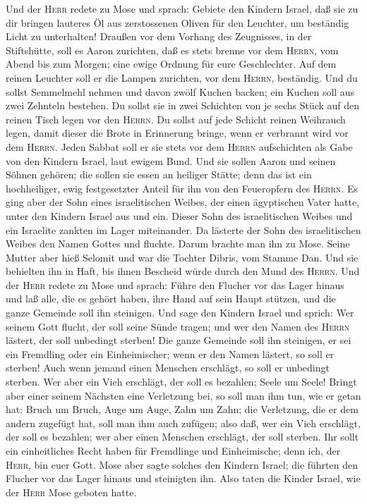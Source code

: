  Und der \textsc{Herr} redete zu Mose und sprach: Gebiete
den Kindern Israel,  daß sie zu dir bringen lauteres Öl
aus zerstossenen Oliven für den Leuchter, um beständig Licht zu
unterhalten!  Draußen vor dem Vorhang des Zeugnisses, in
der Stiftshütte, soll es Aaron zurichten, daß es stets brenne vor dem
\textsc{Herrn}, vom Abend bis zum Morgen; eine ewige Ordnung für eure
Geschlechter.  Auf dem reinen Leuchter soll er die Lampen
zurichten, vor dem \textsc{Herrn}, beständig.  Und du
sollst Semmelmehl nehmen und davon zwölf Kuchen backen; ein Kuchen soll
aus zwei Zehnteln bestehen.  Du sollst sie in zwei
Schichten von je sechs Stück auf den reinen Tisch legen vor den
\textsc{Herrn}.  Du sollst auf jede Schicht reinen
Weihrauch legen, damit dieser die Brote in Erinnerung bringe, wenn er
verbrannt wird vor dem \textsc{Herrn}.  Jeden Sabbat soll
er sie stets vor dem \textsc{Herrn} aufschichten als Gabe von den
Kindern Israel, laut ewigem Bund.  Und sie sollen Aaron
und seinen Söhnen gehören; die sollen sie essen an heiliger Stätte; denn
das ist ein hochheiliger, ewig festgesetzter Anteil für ihn von den
Feueropfern des \textsc{Herrn}.  Es ging aber der Sohn
eines israelitischen Weibes, der einen ägyptischen Vater hatte, unter
den Kindern Israel aus und ein. Dieser Sohn des israelitischen Weibes
und ein Israelite zankten im Lager miteinander.  Da
lästerte der Sohn des israelitischen Weibes den Namen Gottes und
fluchte. Darum brachte man ihn zu Mose. Seine Mutter aber hieß Selomit
und war die Tochter Dibris, vom Stamme Dan.  Und sie
behielten ihn in Haft, bis ihnen Bescheid würde durch den Mund des
\textsc{Herrn}.  Und der \textsc{Herr} redete zu Mose und
sprach:  Führe den Flucher vor das Lager hinaus und laß
alle, die es gehört haben, ihre Hand auf sein Haupt stützen, und die
ganze Gemeinde soll ihn steinigen.  Und sage den Kindern
Israel und sprich: Wer seinem Gott flucht, der soll seine Sünde tragen;
 und wer den Namen des \textsc{Herrn} lästert, der soll
unbedingt sterben! Die ganze Gemeinde soll ihn steinigen, er sei ein
Fremdling oder ein Einheimischer; wenn er den Namen lästert, so soll er
sterben!  Auch wenn jemand einen Menschen erschlägt, so
soll er unbedingt sterben.  Wer aber ein Vieh erschlägt,
der soll es bezahlen; Seele um Seele!  Bringt aber einer
seinem Nächsten eine Verletzung bei, so soll man ihm tun, wie er getan
hat:  Bruch um Bruch, Auge um Auge, Zahn um Zahn; die
Verletzung, die er dem andern zugefügt hat, soll man ihm auch zufügen;
 also daß, wer ein Vieh erschlägt, der soll es bezahlen;
wer aber einen Menschen erschlägt, der soll sterben.  Ihr
sollt ein einheitliches Recht haben für Fremdlinge und Einheimische;
denn ich, der \textsc{Herr}, bin euer Gott.  Mose aber
sagte solches den Kindern Israel; die führten den Flucher vor das Lager
hinaus und steinigten ihn. Also taten die Kinder Israel, wie der
\textsc{Herr} Mose geboten hatte.

